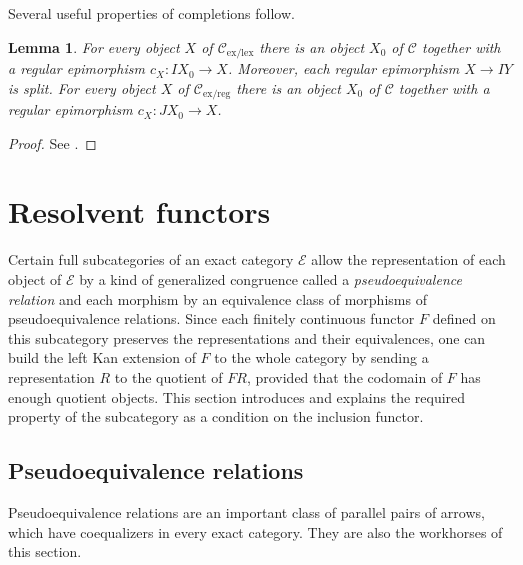 \documentclass[sort&compress]{elsarticle}
\theoremstyle{plain}
\newtheorem{lemma}[theorem]{Lemma}
\theoremstyle{definition}
\theoremstyle{remark}
\newcommand\cat\mathcal
\newcommand\exlex{_\mathrm{ex/lex}}\newcommand\exreg{_\mathrm{ex/reg}}
\begin{document}
\newcommand\id{\mathrm{id}}
Several useful properties of completions follow.

\begin{lemma} For every object $X$ of $\cat C\exlex$ there is an object $X_0$ of $\cat C$ together with a regular epimorphism $c_X:IX_0 \to X$. Moreover, each regular epimorphism $X\to IY$ is split. For every object $X$ of $\cat C\exreg$ there is an object $X_0$ of $\cat C$ together with a regular epimorphism $c_X:JX_0 \to X$.\label{proj} \end{lemma}

\begin{proof} See \citet{MR1600009}. \end{proof}

\section{Resolvent functors}
Certain full subcategories of an exact category $\cat E$ allow the representation of each object of $\cat E$ by a kind of generalized congruence called a \emph{pseudoequivalence relation} and each morphism by an equivalence class of morphisms of pseudoequivalence relations. Since each finitely continuous functor $F$ defined on this subcategory preserves the representations and their equivalences, one can build the left Kan extension of $F$ to the whole category by sending a representation $R$ to the quotient of $FR$, provided that the codomain of $F$ has enough quotient objects. This section introduces and explains the required property of the subcategory as a condition on the inclusion functor.

\subsection{Pseudoequivalence relations} 
Pseudoequivalence relations are an important class of parallel pairs of arrows, which have coequalizers in every exact category. They are also the workhorses of this section.
\end{document}
